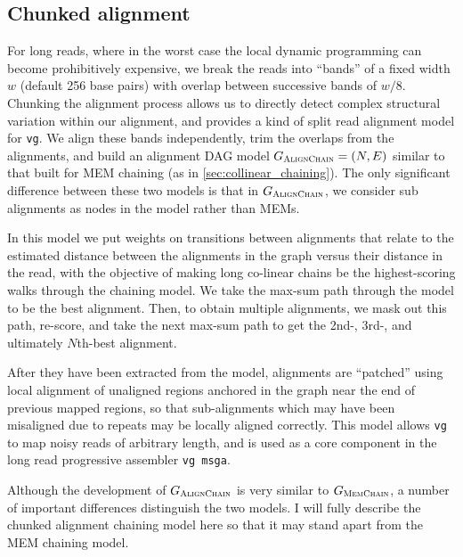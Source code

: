 \subsection{Chunked alignment}
\label{sec:chunked_alignment}

For long reads, where in the worst case the local dynamic programming can become prohibitively expensive, we break the reads into ``bands'' of a fixed width $w$ (default 256 base pairs) with overlap between successive bands of $w/8$.
Chunking the alignment process allows us to directly detect complex structural variation within our alignment, and provides a kind of split read alignment model for {\tt vg}.
We align these bands independently, trim the overlaps from the alignments, and build an alignment DAG model $G_\textsc{AlignChain} = (N, E)$ similar to that built for MEM chaining (as in \ref{sec:collinear_chaining}).
The only significant difference between these two models is that in $G_\textsc{AlignChain}$, we consider sub alignments as nodes in the model rather than MEMs.

In this model we put weights on transitions between alignments that relate to the estimated distance between the alignments in the graph versus their distance in the read, with the objective of making long co-linear chains be the highest-scoring walks through the chaining model.
We take the max-sum path through the model to be the best alignment.
Then, to obtain multiple alignments, we mask out this path, re-score, and take the next max-sum path to get the 2nd-, 3rd-, and ultimately $N$th-best alignment.

After they have been extracted from the model, alignments are ``patched'' using local alignment of unaligned regions anchored in the graph near the end of previous mapped regions, so that sub-alignments which may have been misaligned due to repeats may be locally aligned correctly.
This model allows {\tt vg} to map noisy reads of arbitrary length, and is used as a core component in the long read progressive assembler {\tt vg msga}.

Although the development of $G_\textsc{AlignChain}$ is very similar to $G_\textsc{MemChain}$, a number of important differences distinguish the two models.
I will fully describe the chunked alignment chaining model here so that it may stand apart from the MEM chaining model.

